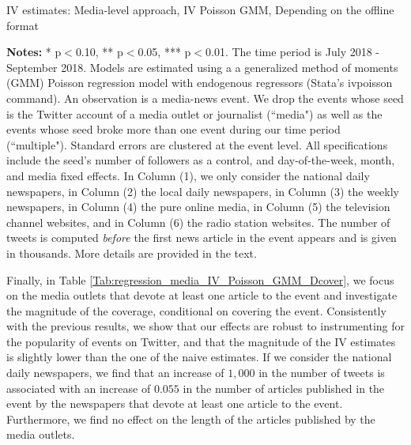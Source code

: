 \begin{table}
\caption{IV estimates: Media-level approach, IV Poisson GMM, Depending on the offline format}
\begin{center}
	
\end{center}
\begin{spacing}{0.5}
	{\fns \textbf{Notes:} * p$<$0.10, ** p$<$0.05, *** p$<$0.01. The time period is July 2018 - September 2018. Models are estimated using a a generalized method of moments (GMM) Poisson regression model with endogenous regressors (Stata's ivpoisson command). An observation is a media-news event. We drop the events whose seed is the Twitter account of a media outlet or journalist (``media") as well as the events whose seed broke more than one event during our time period (``multiple"). Standard errors are clustered at the event level. All specifications include the seed's number of followers as a control, and day-of-the-week, month, and media fixed effects.  In Column (1), we only consider the national daily newspapers, in Column (2) the local daily newspapers, in Column (3) the weekly newspapers, in Column (4) the pure online media, in Column (5) the television channel websites, and in Column (6) the radio station  websites. The number of tweets is computed \textit{before} the first news article in the event appears and is given in thousands. More details are provided in the text.}
\end{spacing}
\label{Tab:regression_media_IV_Poisson_GMM}
\end{table} 


Finally, in Table \ref{Tab:regression_media_IV_Poisson_GMM_Dcover}, we focus on the media outlets that devote at least one article to the event and investigate the magnitude of the coverage, conditional on covering the event. Consistently with the previous results, we show that our effects are robust to instrumenting for the popularity of events on Twitter, and that the magnitude of the IV estimates is slightly lower than the one of the naive estimates. If we consider the national daily newspapers, we find that an increase of $1,000$ in the number of tweets is associated with an increase of $0.055$ in the number of articles published in the event by the newspapers that devote at least one article to the event. Furthermore, we find no effect on the length of the articles published by the media outlets.


